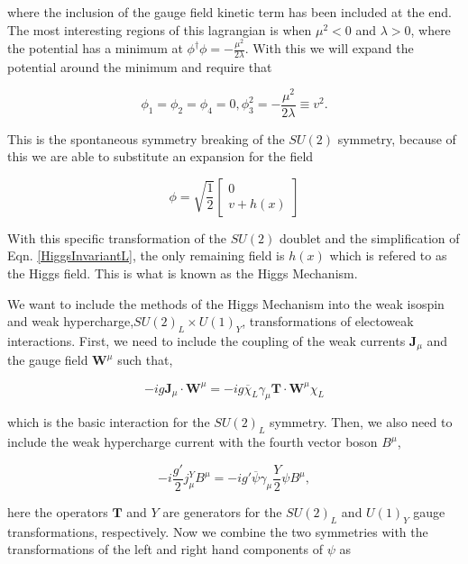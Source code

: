 where the inclusion of the gauge field kinetic term has been included at the end. The most interesting regions of this lagrangian is when $\mu^2<0$ and $\lambda>0$, where the potential has a minimum at $\phi^\dagger\phi=-\frac{\mu^2}{2\lambda}$. With this we will expand the potential around the minimum and require that

\begin{equation}
\phi_1=\phi_2=\phi_4=0, \phi_3^2=-\frac{\mu^2}{2\lambda}\equiv v^2.
\end{equation}

This is the spontaneous symmetry breaking of the $SU(2)$ symmetry, because of this we are able to substitute an expansion for the field

\begin{equation}
\phi=\sqrt{\frac{1}{2}}
\begin{bmatrix}
0 \\
v+h(x)
\end{bmatrix}
\end{equation}

With this specific transformation of the $SU(2)$ doublet and the simplification of Eqn. \ref{HiggsInvariantL}, the only remaining field is $h(x)$ which is refered to as the Higgs field. This is what is known as the Higgs Mechanism. 

We want to include the methods of the Higgs Mechanism into the weak isospin and weak hypercharge,$SU(2)_L\times U(1)_Y$, transformations of electoweak interactions. First, we need to include the coupling of the weak currents $\boldsymbol{J}_\mu$ and the gauge field $\boldsymbol{W}^\mu$ such that,

\begin{equation}
-ig\boldsymbol{J}_\mu\cdot\boldsymbol{W}^\mu=-ig\overline{\chi}_L\gamma_\mu\boldsymbol{T}\cdot\boldsymbol{W}^\mu\chi_L
\end{equation}

which is the basic interaction for the $SU(2)_L$ symmetry. Then, we also need to include the weak hypercharge current with the fourth vector boson $B^\mu$,

\begin{equation}
-i\frac{g'}{2}j_\mu^YB^\mu=-ig'\overline{\psi}\gamma_\mu\frac{Y}{2}\psi B^\mu, 
\end{equation}

here the operators $\boldsymbol{T}$ and $Y$ are generators for the $SU(2)_L$ and $U(1)_Y$ gauge transformations, respectively. Now we combine the two symmetries with the transformations of the left and right hand components of $\psi$ as

